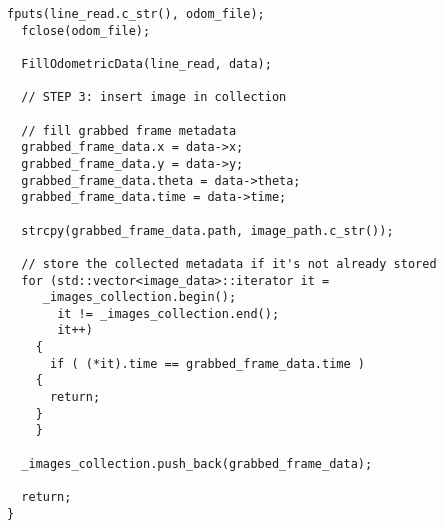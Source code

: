 \begin{lstlisting}[caption={\texttt{DataLogicMorduc::RetrieveData()} method},
    label={code:datalogicmorduc:retrievedata}]
  fputs(line_read.c_str(), odom_file);
  fclose(odom_file);

  FillOdometricData(line_read, data);

  // STEP 3: insert image in collection
   
  // fill grabbed frame metadata
  grabbed_frame_data.x = data->x;
  grabbed_frame_data.y = data->y;
  grabbed_frame_data.theta = data->theta;
  grabbed_frame_data.time = data->time;

  strcpy(grabbed_frame_data.path, image_path.c_str());

  // store the collected metadata if it's not already stored
  for (std::vector<image_data>::iterator it =
	 _images_collection.begin();
       it != _images_collection.end();
       it++)
    {
      if ( (*it).time == grabbed_frame_data.time )
	{
	  return;
	}
    }

  _images_collection.push_back(grabbed_frame_data);
  
  return;
}
\end{lstlisting}

